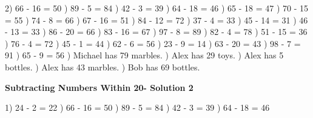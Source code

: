 \documentclass{article}%
\begin{document}
2) 66 {-} 16 = 50%
) 89 {-} 5 = 84%
) 42 {-} 3 = 39%
) 64 {-} 18 = 46%
) 65 {-} 18 = 47%
) 70 {-} 15 = 55%
) 74 {-} 8 = 66%
) 67 {-} 16 = 51%
) 84 {-} 12 = 72%
) 37 {-} 4 = 33%
) 45 {-} 14 = 31%
) 46 {-} 13 = 33%
) 86 {-} 20 = 66%
) 83 {-} 16 = 67%
) 97 {-} 8 = 89%
) 82 {-} 4 = 78%
) 51 {-} 15 = 36%
) 76 {-} 4 = 72%
) 45 {-} 1 = 44%
) 62 {-} 6 = 56%
) 23 {-} 9 = 14%
) 63 {-} 20 = 43%
) 98 {-} 7 = 91%
) 65 {-} 9 = 56%
) Michael has 79 marbles.%
) Alex has 29 toys.%
) Alex has 5 bottles.%
) Alex has 43 marbles.%
) Bob has 69 bottles.%
\newline%
\newpage%
\large%
\begin{center}%
\textbf{Subtracting Numbers Within 20- Solution 2}%
\newline%
\end{center} \normalsize%
1) 24 {-} 2 = 22%
) 66 {-} 16 = 50%
) 89 {-} 5 = 84%
) 42 {-} 3 = 39%
) 64 {-} 18 = 46%
\newline%
\end{document}
